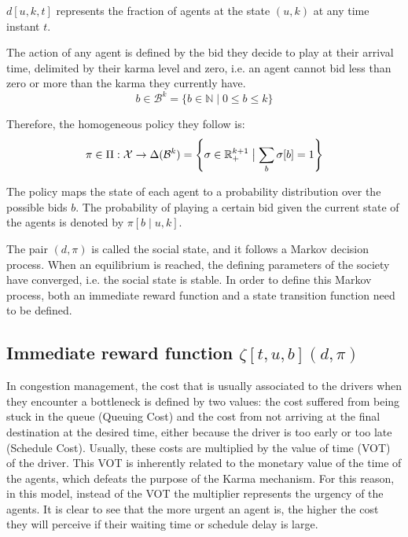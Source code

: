 \documentclass[a4paper,11pt,twoside]{book}
\begin{document}
$d[u,k,t]$ represents the fraction of agents at the state $(u,k)$ at any time instant $t$. 

The action of any agent is defined by the bid they decide to play at their arrival time, delimited by their karma level and zero, i.e. an agent cannot bid less than zero or more than the karma they currently have. 
\begin{equation*}
    b \in \mathcal{B}^k = \{b \in \mathbb{N} \mid 0 \leq b \leq k\}
\end{equation*}

Therefore, the homogeneous policy they follow is:
\begin{equation*}
    \pi \in \Pi : \mathcal{X} \rightarrow \Delta(\mathcal{B}^k) = \left\{\sigma \in \mathbb{R}_+^{k+1} \bigm\vert \sum_{b} \sigma[b] = 1 \right\}
\end{equation*}

The policy maps the state of each agent to a probability distribution over the possible bids $b$. The probability of playing a certain bid given the current state of the agents is denoted by $\pi[b \mid u,k]$.

The pair $(d,\pi)$ is called the social state, and it follows a Markov decision process. When an equilibrium is reached, the defining parameters of the society have converged, i.e. the social state is stable. In order to define this Markov process, both an immediate reward function and a state transition function need to be defined. 


\subsection{Immediate reward function $\zeta[t,u,b](d,\pi)$}

In congestion management, the cost that is usually associated to the drivers when they encounter a bottleneck is defined by two values: the cost suffered from being stuck in the queue (Queuing Cost) and the cost from not arriving at the final destination at the desired time, either because the driver is too early or too late (Schedule Cost). Usually, these costs are multiplied by the value of time (VOT) of the driver. This VOT is inherently related to the monetary value of the time of the agents, which defeats the purpose of the Karma mechanism. For this reason, in this model, instead of the VOT the multiplier represents the urgency of the agents. It is clear to see that the more urgent an agent is, the higher the cost they will perceive if their waiting time or schedule delay is large.
\end{document}
